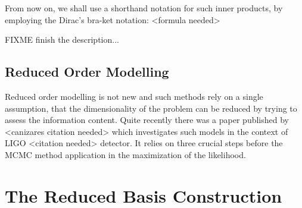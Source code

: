 \documentclass{scrreprt}
\begin{document}
    From now on, we shall use a shorthand notation for such inner products, by
    employing the Dirac's bra-ket notation:
    <formula needed>

    FIXME finish the description...

    \section{Reduced Order Modelling}

    Reduced order modelling is not new and such methods rely on a single
    assumption, that the dimensionality of the problem can be reduced by trying to
    assess the information content.
    Quite recently there was a paper published by <canizares citation needed>
    which investigates such models in the context of LIGO <citation needed>
    detector.
    It relies on three crucial steps before the MCMC method application in the
    maximization of the likelihood.

    \chapter{The Reduced Basis Construction}
\end{document}
